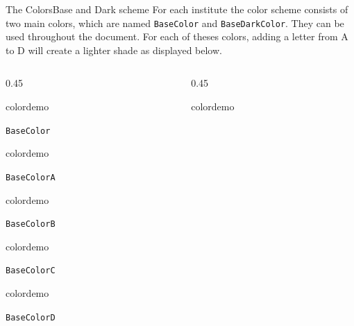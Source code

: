 \documentclass[final]{beamer}
\begin{document}
\begin{frame}{The Colors}{Base and Dark scheme}
  For each institute the color scheme consists of two main colors,
  which are named
  \texttt{BaseColor} and \texttt{BaseDarkColor}. They can be used
  throughout the document. For each of theses colors, adding a letter
  from A to D will create a lighter shade as displayed below.
  \newdimen\bwidth
  \setlength{\bwidth}{0.35\textwidth}
  \vspace{1em}%
  \begin{columns}
    \begin{column}{0.45\textwidth}
      \begin{beamercolorbox}[dp=0pt,sep=0em,wd=\bwidth,ht=10cm]{}
        \begin{beamercolorbox}[sep=0em,wd=2cm,ht=2cm]{colordemo}%
        \end{beamercolorbox}\quad\texttt{BaseColor}\newline%
        \begin{beamercolorbox}[sep=0em,wd=2cm,ht=2cm]{colordemo}
        \end{beamercolorbox}\quad\texttt{BaseColorA}\hfill\newline%
        \begin{beamercolorbox}[sep=0em,wd=2cm,ht=2cm]{colordemo}%
        \end{beamercolorbox}\quad\texttt{BaseColorB}\hfill\newline%
        \begin{beamercolorbox}[sep=0em,wd=2cm,ht=2cm]{colordemo}%
        \end{beamercolorbox}\quad\texttt{BaseColorC}\hfill\newline%
        \begin{beamercolorbox}[sep=0em,wd=2cm,ht=2cm]{colordemo}%
        \end{beamercolorbox}\quad\texttt{BaseColorD}%
      \end{beamercolorbox}%
    \end{column}
    \begin{column}{0.45\textwidth}
      \begin{beamercolorbox}[dp=0pt,sep=0em,wd=\bwidth,ht=10cm]{}
        \begin{beamercolorbox}[sep=0em,wd=2cm,ht=2cm]{colordemo}%

\end{beamercolorbox}
\end{beamercolorbox}
\end{column}
\end{columns}
\end{frame}
\end{document}
